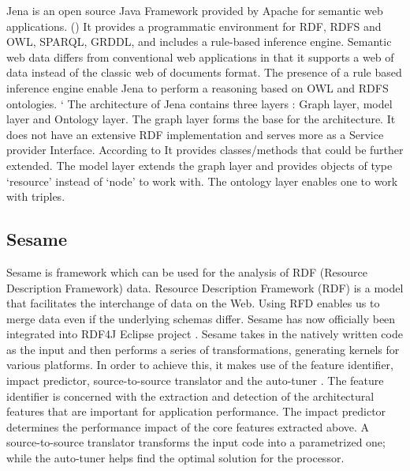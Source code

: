      Jena is an open source Java Framework provided by Apache for
     semantic web applications. (\cite{www-w3-jena}) It provides a
     programmatic environment for RDF, RDFS and OWL, SPARQL, GRDDL,
     and includes a rule-based inference engine. Semantic web data
     differs from conventional web applications in that it supports a
     web of data instead of the classic web of documents format. The
     presence of a rule based inference engine enable Jena to perform
     a reasoning based on OWL and RDFS ontologies.
     \cite{www-trimc-nlp-blogspot} ` The architecture of Jena
     contains three layers : Graph layer, model layer and Ontology
     layer. The graph layer forms the base for the architecture. It
     does not have an extensive RDF implementation and serves more as
     a Service provider Interface. According to
     \cite{www-trimc-nlp-blogspot} It provides classes/methods that
     could be further extended. The model layer extends the graph
     layer and provides objects of type ‘resource’ instead of ‘node’
     to work with.  The ontology layer enables one to work with
     triples.

\subsection{ Sesame}

     Sesame is framework which can be used for the analysis of RDF
     (Resource Description Framework) data.  Resource Description
     Framework (RDF) \cite{www-RDF} is a model that facilitates the
     interchange of data on the Web.  Using RFD enables us to merge
     data even if the underlying schemas differ.  Sesame has now 
     officially been integrated into RDF4J Eclipse project \cite{www-sesame}.  
     Sesame takes in the natively written code as the input and then 
     performs a series of transformations, generating kernels for
     various platforms.  In order to achieve this, it makes use of the
     feature identifier, impact predictor, source-to-source translator 
     and the auto-tuner \cite{sesame-paper-2013}.  The
     feature identifier is concerned with the extraction and detection
     of the architectural features that are important for application
     performance.  The impact predictor determines the performance
     impact of the core features extracted above.  A source-to-source
     translator transforms the input code into a parametrized one;
     while the auto-tuner helps find the optimal solution for the
     processor.
     
